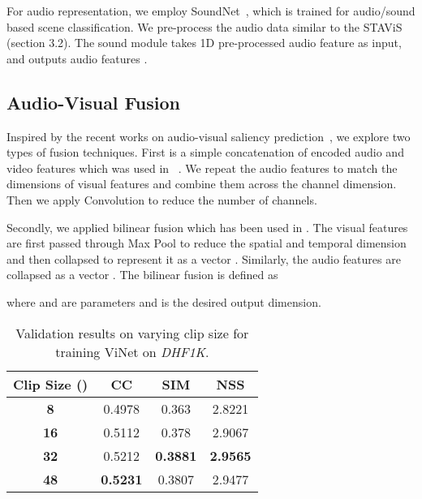 \documentclass[letterpaper, 10 pt, conference]{ieeeconf}  \usepackage{times}
\begin{document}
For audio representation, we employ SoundNet~\cite{aytar2016soundnet}, which is trained for audio/sound based scene classification. We pre-process the audio data similar to the STAViS~\cite{tsiami2020stavis} (section 3.2). The sound module takes 1D pre-processed audio feature as input,  and outputs audio features .  



\subsection{Audio-Visual Fusion}
Inspired by the recent works on audio-visual saliency prediction~\cite{tsiami2020stavis,tavakoli2019dave}, we explore two types of fusion techniques. First is a simple concatenation of encoded audio and video features which was used in ~\cite{tavakoli2019dave}. We repeat the audio features to match the dimensions of visual features and combine them across the channel dimension. Then we apply  Convolution to reduce the number of channels.

Secondly, we applied bilinear fusion which has been used in \cite{tsiami2020stavis}. The visual features are first passed through Max Pool to reduce the spatial and temporal dimension and then collapsed to represent it as a vector . Similarly, the audio features are collapsed as a vector . The bilinear fusion is defined as 

where  and  are parameters and  is the desired output dimension. 




\begin{table}[]
    \caption{Validation results on varying clip size for training ViNet on \emph{DHF1K}.}
    \begin{center}
    
\begin{tabular}{|c|ccc|}
\hline
       \textbf{Clip Size ()} & CC  & SIM & NSS \\
\hline\hline
    \textbf{8}           &0.4978	&0.363	&2.8221 \\
    \textbf{16}           &0.5112	&0.378	&2.9067 \\
    \textbf{32}          &0.5212	&\textbf{0.3881}	&\textbf{2.9565} \\
    \textbf{48}          &\textbf{0.5231}	&0.3807	&2.9477 \\
\hline
    \end{tabular}
    \end{center}
    
    \label{tab:clip_length}
\end{table}
\end{document}
